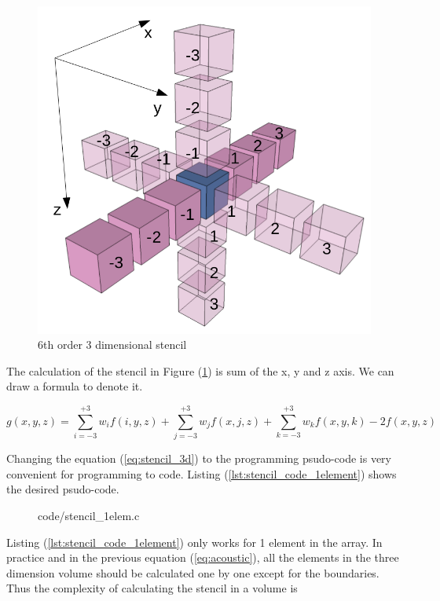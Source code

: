 \begin{figure}[h]
  \centering
  \includegraphics[scale=0.4]{img/stencil_6_3d.png}
  \caption{6th order 3 dimensional stencil}
  \label{fig:6th_order_stencil_3d}
\end{figure}

The calculation of the stencil in Figure (\ref{fig:6th_order_stencil_3d})
is sum of the x, y and z axis. We can draw a formula to denote it.

\begin{equation}
  g(x,y,z) = \sum _{i=-3} ^{+3} w_i  f(i,y,z) +
             \sum _{j=-3} ^{+3} w_j  f(x,j,z) +
             \sum _{k=-3} ^{+3} w_k  f(x,y,k) -
             2f(x,y,z)
 \label{eq:stencil_3d}
\end{equation}

Changing the equation (\ref{eq:stencil_3d}) to the programming psudo-code
is very convenient for programming to code. Listing (\ref{lst:stencil_code_1element})
shows the desired psudo-code.

\begin{figure}
\centering

  {code/stencil_1elem.c}
\end{figure}

Listing (\ref{lst:stencil_code_1element}) only works for 1 element in the
array. In practice and in the previous equation (\ref{eq:acoustic}), all
the elements in the three dimension volume should be calculated one by one
except for the boundaries. Thus the complexity of calculating the stencil
in a volume is 

